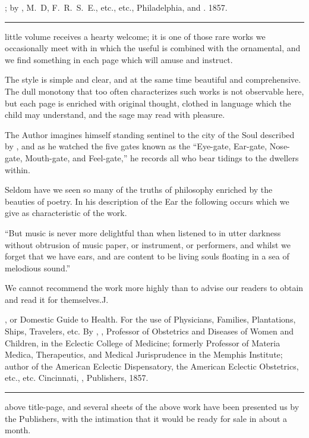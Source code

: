 
\smallornament
\footnotesize
{}; by , M.~D, F.~R.~S.~E., etc., etc.,
Philadelphia,  and . 1857.
\plainbreak{1}
\normalsize

 little volume receives a hearty welcome; it is one of those rare
works we occasionally meet with in which the useful is combined
with the ornamental, and we find something in each page which will
amuse and instruct.

The style is simple and clear, and at the same time beautiful and
comprehensive. The dull monotony that too often characterizes such
works is not observable here, but each page is enriched with original
thought, clothed in language which the child may understand, and the
sage may read with pleasure.

The Author imagines himself standing sentinel to the city of the Soul
described by , and as he watched the five gates known
as the ``Eye-gate, Ear-gate, Nose-gate, Mouth-gate, and Feel-gate,'' he
records all who bear tidings to the dwellers within.

Seldom have we seen so many of the truths of philosophy enriched
by the beauties of poetry. In his description of the Ear the following
occurs which we give as characteristic of the work.

``But music is never more delightful than when listened to in utter
darkness without obtrusion of music paper, or instrument, or performers,
and whilst we forget that we have ears, and are content to be living
souls floating in a sea of melodious sound.''

We cannot recommend the work more highly than to advise our readers
to obtain and read it for themselves.\hfill{}J.\quad{}

\smallornament
\footnotesize
{}, or Domestic Guide to Health. For the use of Physicians,
Families, Plantations, Ships, Travelers, etc. By , \md, Professor of
Obstetrics and Diseases of Women and Children, in the Eclectic College of Medicine;
formerly Professor of Materia Medica, Therapeutics, and Medical Jurisprudence in the
Memphis Institute; author of the American Eclectic Dispensatory, the American
Eclectic Obstetrics, etc., etc. Cincinnati, , Publishers, 1857.
\plainbreak{1}
\normalsize

 above title-page, and several sheets of the above work have
been presented us by the Publishers, with the intimation that it would
be ready for sale in about a month.

